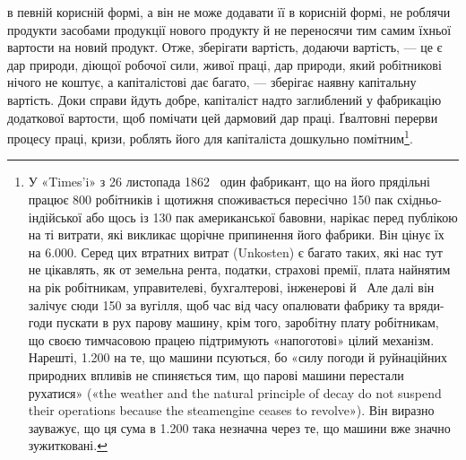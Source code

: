 \parcont{}  %
в певній корисній формі, а він не може додавати її в корисній
формі, не роблячи продукти засобами продукції нового продукту
й не переносячи тим самим їхньої вартости на новий продукт.
Отже, зберігати вартість, додаючи вартість, — це є дар природи,
діющої робочої сили, живої праці, дар природи, який робітникові
нічого не коштує, а капіталістові дає багато, — зберігає наявну
капітальну вартість.  Доки справи йдуть добре, капіталіст
надто заглиблений у фабрикацію додаткової вартости, щоб помічати
цей дармовий дар праці. Ґвалтовні перерви процесу праці,
кризи, роблять його для капіталіста дошкульно помітним\footnote{
У «Times’i» з 26 листопада 1862~ один фабрикант, що на його
прядільні працює 800 робітників і щотижня споживається пересічно 150 пак
східньо-індійської або щось із 130 пак американської бавовни, нарікає
перед публікою на ті витрати, які викликає щорічне припинення його
фабрики. Він цінує їх на \num{6.000}. Серед цих втратних
витрат (Unkosten) є багато таких, які нас тут не цікавлять, як от земельна
рента, податки, страхові премії, плата найнятим на рік робітникам, управителеві,
бухгалтерові, інженерові й~ Але далі він залічує сюди
150 за вугілля, щоб час від часу опалювати фабрику та
вряди-годи пускати в рух парову машину, крім того, заробітну плату
робітникам, що своєю тимчасовою працею підтримують «напоготові»
цілий механізм. Нарешті, \num{1.200} на те, що машини псуються,
бо «силу погоди й руйнаційних природних впливів не спиняється
тим, що парові машини перестали рухатися» («the weather and the natural
principle of decay do not suspend their operations because the steamengine
ceases to revolve»). Він виразно зауважує, що ця сума в \num{1.200} така незначна через те, що машини вже значно зужитковані.
}.

